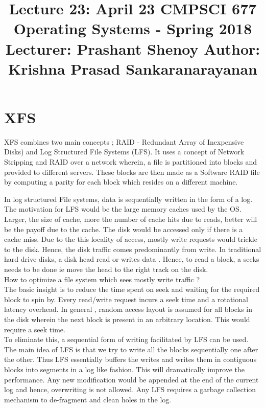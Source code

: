 \documentclass[a4paper]{article}
\title{
Lecture 23: April 23\linebreak
CMPSCI 677 Operating Systems - Spring 2018 \linebreak
Lecturer: Prashant Shenoy \linebreak
Author: Krishna Prasad Sankaranarayanan
}
\begin{document}
\maketitle

\section{XFS}
  XFS combines two main concepts ; RAID - Redundant Array of Inexpensive Disks) and Log Structured File Systems (LFS). It uses a concept of Network Stripping and RAID over a network wherein, a file is partitioned into blocks and provided to different servers. These blocks are then made as a Software RAID file by computing a parity for each block which resides on a different machine.

In log structured File systems, data is sequentially written in the form of a log. The motivation for LFS would be the large memory caches used by the OS. Larger, the size of cache, more the number of cache hits due to reads, better will be the payoff due to the cache. The disk would be accessed only if there is a cache miss. Due to the this locality of access, mostly write requests would trickle to the disk.  Hence, the disk traffic comes predominantly from write. In traditional hard drive disks, a disk head read or writes data . Hence, to read a block,  a seeks needs to be done ie move the head to the right track on the disk. \\

How to optimize a file system which sees mostly write traffic ?\\

The basic insight is to reduce the time spent on seek and waiting for the required block to spin by. Every read/write request incurs a seek time and a rotational latency overhead. In general , random access layout  is assumed for all blocks in the disk wherein the next block is present in an arbitrary location. This would require a seek time.\\

To eliminate this, a sequential form of writing facilitated by LFS can be used. The main idea of LFS is that we try to write all the blocks sequentially one after the other. Thus LFS essentially buffers the writes and writes them  in contiguous blocks into segments in a log like fashion. This will dramatically improve the performance. Any new modification would be appended at the end of the current log and hence, overwriting is not allowed. Any LFS requires a garbage collection mechanism to de-fragment and clean holes in the log.\\
\end{document}
